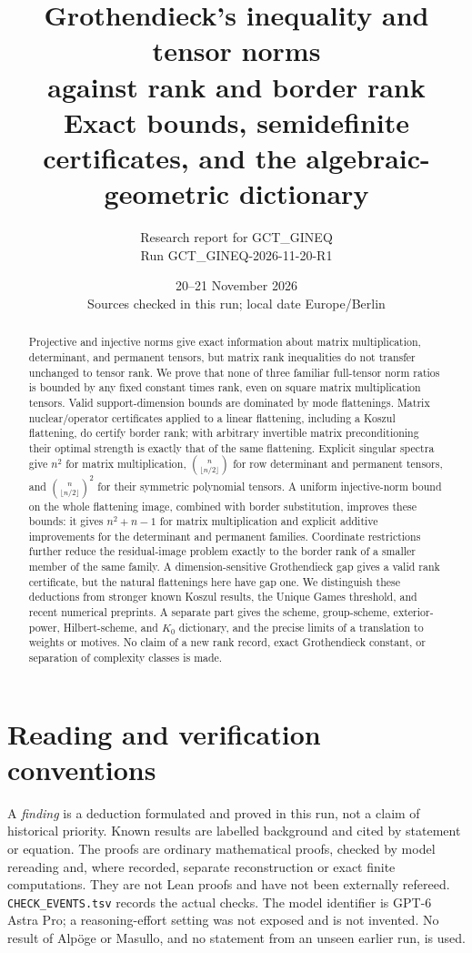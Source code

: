 \documentclass[11pt]{article}
\title{\textbf{Grothendieck's inequality and tensor norms\\against rank and border rank}\\[5pt]
\large Exact bounds, semidefinite certificates, and the algebraic-geometric dictionary}
\author{Research report for GCT\_GINEQ\\\small Run GCT\_GINEQ-2026-11-20-R1}
\date{20--21 November 2026\\\small Sources checked in this run; local date Europe/Berlin}
\begin{document}
\maketitle
\begin{abstract}
Projective and injective norms give exact information about matrix multiplication,
determinant, and permanent tensors, but matrix rank inequalities do not transfer
unchanged to tensor rank. We prove that none of three familiar full-tensor norm
ratios is bounded by any fixed constant times rank, even on square matrix
multiplication tensors. Valid support-dimension bounds are dominated by mode
flattenings. Matrix nuclear/operator certificates applied to a linear flattening,
including a Koszul flattening, do certify border rank; with arbitrary invertible
matrix preconditioning their optimal strength is exactly that of the same
flattening. Explicit singular spectra give $n^2$ for matrix multiplication,
$\binom n{\lfloor n/2\rfloor}$ for row determinant and permanent tensors, and
$\binom n{\lfloor n/2\rfloor}^2$ for their symmetric polynomial tensors.
A uniform injective-norm bound on the whole flattening image,
combined with border substitution, improves these bounds: it gives
$n^2+n-1$ for matrix multiplication and explicit additive
improvements for the determinant and permanent families. Coordinate
restrictions further reduce the residual-image problem exactly to
the border rank of a smaller member of the same family.
A dimension-sensitive Grothendieck gap gives a valid rank certificate, but the
natural flattenings here have gap one. We distinguish these deductions from
stronger known Koszul results, the Unique Games threshold, and recent numerical
preprints. A separate part gives the scheme, group-scheme, exterior-power,
Hilbert-scheme, and $K_0$ dictionary, and the precise limits of a translation
to weights or motives. No claim of a new rank record, exact Grothendieck
constant, or separation of complexity classes is made.
\end{abstract}
\clearpage
{\small\tableofcontents}
\newpage

\section*{Reading and verification conventions}
A \emph{finding} is a deduction formulated and proved in this run, not a
claim of historical priority. Known results are labelled background and
cited by statement or equation. The proofs are ordinary mathematical proofs,
checked by model rereading and, where recorded, separate reconstruction or
exact finite computations. They are not Lean proofs and have not been
externally refereed. \texttt{CHECK\_EVENTS.tsv} records the actual checks.
The model identifier is GPT-6 Astra Pro; a reasoning-effort setting was not
exposed and is not invented. No result of Alp\"oge or Masullo, and no
statement from an unseen earlier run, is used.
\end{document}
